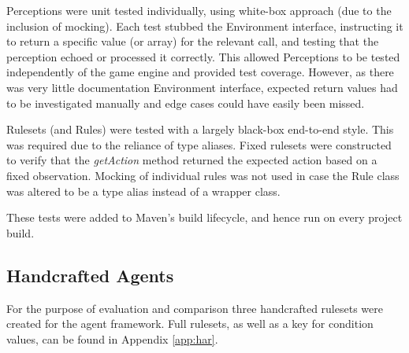 Perceptions were unit tested individually, using white-box approach (due to the inclusion of mocking). Each test stubbed the Environment interface, instructing it to return a specific value (or array) for the relevant call, and testing that the perception echoed or processed it correctly. This allowed Perceptions to be tested independently of the game engine and provided test coverage. However, as there was very little documentation Environment interface, expected return values had to be investigated manually and edge cases could have easily been missed.

Rulesets (and Rules) were tested with a largely black-box end-to-end style. This was required due to the reliance of type aliases. Fixed rulesets were constructed to verify that the \emph{getAction} method returned the expected action based on a fixed observation. Mocking of individual rules was not used in case the Rule class was altered to be a type alias instead of a wrapper class.

These tests were added to Maven's build lifecycle, and hence run on every project build.


\subsection{Handcrafted Agents}
\label{subsec:hca}

For the purpose of evaluation and comparison three handcrafted rulesets were created for the agent framework. Full rulesets, as well as a key for condition values, can be found in Appendix \ref{app:har}.

